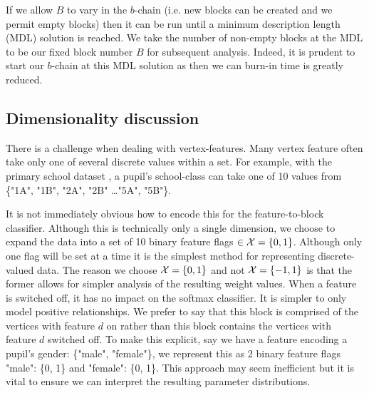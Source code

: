 If we allow $B$ to vary in the $b$-chain (i.e. new blocks can be created and we permit empty blocks) then it can be run  until a minimum description length (MDL) solution is reached. We take the number of non-empty blocks at the MDL to be our fixed block number $B$ for subsequent analysis. Indeed, it is prudent to start our $b$-chain at this MDL solution as then we can burn-in time is greatly reduced.

\subsection{Dimensionality discussion}
\label{appdx:dimension}

There is a challenge when dealing with vertex-features. Many vertex feature often take only one of several discrete values within a set. For example, with the primary school dataset \cite{schools}, a pupil's school-class can take one of 10 values from \{"1A", "1B", "2A", "2B" \dots "5A", "5B"\}.

It is not immediately obvious how to encode this for the feature-to-block classifier. Although this is technically only a single dimension, we choose to expand the data into a set of 10 binary feature flags $\in \mathcal{X} = \{0, 1\}$. Although only one flag will be set at a time it is the simplest method for representing discrete-valued data. The reason we choose $\mathcal{X}=\{0, 1\}$ and not $\mathcal{X} = \{-1, 1\}$ is that the former allows for simpler analysis of the resulting weight values. When a feature is switched off, it has no impact on the softmax classifier. It is simpler to only model positive relationships. We prefer to say that this block is comprised of the vertices with feature $d$ on rather than this block contains the vertices with feature $d$ switched off. To make this explicit, say we have a feature encoding a pupil's gender: \{"male", "female"\}, we represent this as 2 binary feature flags "male": \{0, 1\} and "female": \{0, 1\}. This approach may seem inefficient but it is vital to ensure we can interpret the resulting parameter distributions.

